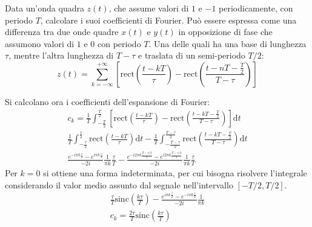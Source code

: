 \documentclass{article}
\newcommand{\rect}{\mathrm{rect}}
\newcommand{\sinc}{\mathrm{sinc}}
\newcommand{\df}{\mathrm{d}}
\begin{document}
Data un'onda quadra $z(t)$, che assume valori di $1$ e $-1$ periodicamente, con periodo $T$, calcolare i suoi coefficienti di Fourier. 
Può essere espressa come una differenza tra due onde quadre $x(t)$ e $y(t)$ in 
opposizione di fase che assumono valori di $1$ e $0$ con periodo $T$. Una delle quali ha una base di lunghezza $\tau$, mentre l'altra lunghezza di $T-\tau$ e traslata di un 
semi-periodo $T/2$:
\begin{equation*}
    z(t)=\displaystyle\sum_{k=-\infty}^{+\infty}\left[\rect\left(\frac{t-kT}{\tau}\right)-\rect\left(\frac{t-nT-\frac{T}{2}}{T-\tau}\right)\right]
\end{equation*}
\begin{center}
\end{center}
Si calcolano ora i coefficienti dell'espansione di Fourier:
\begin{gather*}
    c_k=\displaystyle\frac{1}{T}\int_{-\frac{T}{2}}^{\frac{T}{2}}\left[\rect\left(\frac{t-kT}{\tau}\right)-\rect\left(\frac{t-kT-\frac{T}{2}}{T-\tau}\right)\right]\df t\\
    \displaystyle\frac{1}{T}\int_{-\frac{\tau}{2}}^{\frac{\tau}{2}}\rect\left(\frac{t-kT}{\tau}\right)\df t-\frac{1}{T}\int_{-\frac{T-\tau}{2}}^{\frac{T-\tau}{2}}\rect\left(\frac{t-kT-\frac{T}{2}}{T-\tau}\right)\df t\\
    \displaystyle\frac{e^{-i\pi k\frac{\tau}{T}}-e^{i\pi k\frac{\tau}{T}}}{-2i}\frac{1}{\pi k}\frac{\tau}{T}-\frac{e^{-i2\pi k\frac{T-\tau/2}{T}}-e^{i2\pi k\frac{T-\tau/2}{T}}}{-2i}\frac{1}{\pi k}\frac{\tau}{T}
\end{gather*}
Per $k=0$ si ottiene una forma indeterminata, per cui bisogna risolvere l'integrale considerando il valor medio assunto dal segnale nell'intervallo $\left[-T/2,T/2\right]$. 
\begin{gather*}
    \displaystyle\frac{\tau}{T}\sinc\left(\frac{k\tau}{T}\right)-\frac{e^{i\pi k\frac{\tau}{T}}-e^{-i\pi k\frac{\tau}{T}}}{-2i}\frac{1}{\pi k}\\
    c_k=\displaystyle\frac{2\tau}{T}\sinc\left(\frac{k\tau}{T}\right)
\end{gather*}
\end{document}
